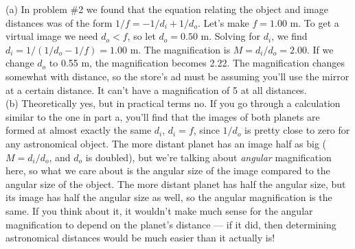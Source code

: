 (a) In problem \#2 we found that the equation relating
the object and image distances was of the form
$1/f=-1/d_i+1/d_o$. Let's make $f=1.00$ m. To get a virtual
image we need $d_o<f$, so let $d_o=0.50$ m. Solving for
$d_i$, we find $d_i=1/(1/d_o-1/f)=1.00$ m. The magnification
is $M=d_i/d_o=2.00$. If we change $d_o$ to 0.55 m, the
magnification becomes 2.22. The magnification changes
somewhat with distance, so the store's ad must be assuming
you'll use the mirror at a certain distance. It can't have a
magnification of 5 at all distances.\\
(b) Theoretically yes, but in practical terms no.
If you go through a calculation similar to the one in part a,
you'll find that
the images of both planets are formed at almost exactly the
same $d_i$, $d_i=f$, since $1/d_o$ is
pretty close to zero for any astronomical object.
The more distant planet has an image half as big
($M=d_i/d_o$, and $d_o$ is doubled), but
we're talking about \emph{angular} magnification here,
so what we care about is the angular size of the image
compared to the angular size of the object. The more
distant planet has half the angular size, but its image
has half the angular size as well, so the angular magnification
is the same. If you think about it, it wouldn't make much sense
for the angular magnification to depend on the planet's distance
--- if it did, then determining astronomical distances would
be much easier than it actually is!
